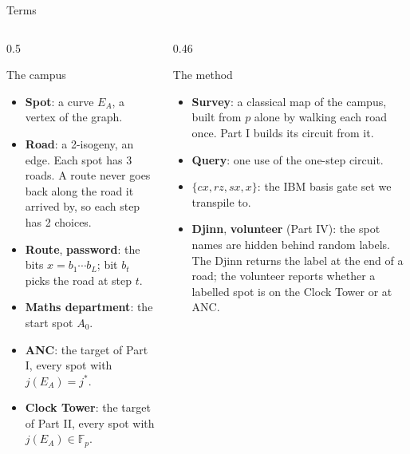 \documentclass[aspectratio=169,10pt]{beamer}
\begin{document}
\begin{frame}{Terms}
\begin{columns}[T]
\begin{column}{0.5\textwidth}
\begin{block}{The campus}
\begin{itemize}\small
\item \textbf{Spot}: a curve $E_A$, a vertex of the graph.
\item \textbf{Road}: a 2-isogeny, an edge. Each spot has 3 roads. A route never goes back along the road it arrived by, so each step has 2 choices.
\item \textbf{Route}, \textbf{password}: the bits $x=b_1\cdots b_L$; bit $b_t$ picks the road at step $t$.
\item \textbf{Maths department}: the start spot $A_0$.
\item \textbf{ANC}: the target of Part I, every spot with $j(E_A)=j^*$.
\item \textbf{Clock Tower}: the target of Part II, every spot with $j(E_A)\in\mathbb F_p$.
\end{itemize}
\end{block}
\end{column}
\begin{column}{0.46\textwidth}
\begin{block}{The method}
\begin{itemize}\small
\item \textbf{Survey}: a classical map of the campus, built from $p$ alone by walking each road once. Part I builds its circuit from it.
\item \textbf{Query}: one use of the one-step circuit.
\item \textbf{$\{cx,rz,sx,x\}$}: the IBM basis gate set we transpile to.
\item \textbf{Djinn}, \textbf{volunteer} (Part IV): the spot names are hidden behind random labels. The Djinn returns the label at the end of a road; the volunteer reports whether a labelled spot is on the Clock Tower or at ANC.
\end{itemize}
\end{block}
\end{column}
\end{columns}
\end{frame}
\end{document}
